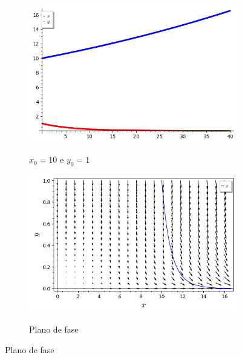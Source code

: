 \begin{figure}[H]
    \centering
    \begin{subfigure}{0.4\textwidth}
        \includegraphics[scale=0.48]{figuras/LV_2.png}
        \label{fig:LV_2}
        \caption{$x_0 = 10$ e $y_0 = 1$}
    \end{subfigure}
    \begin{subfigure}{0.4\textwidth}
        \includegraphics[scale=0.48]{figuras/LV_5.png}
        \label{fig:LV_5}
        \caption{Plano de fase}
    \end{subfigure}
\end{figure}

